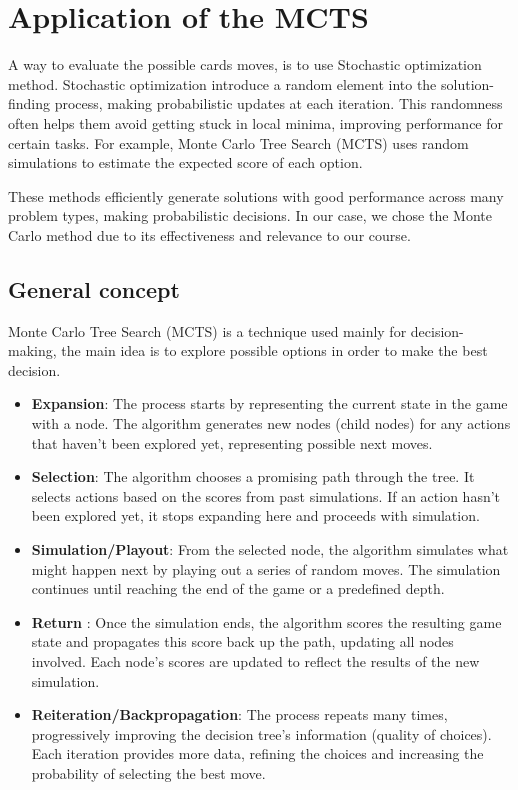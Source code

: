 \chapter{Application of the MCTS}
A way to evaluate the possible cards moves, is to use Stochastic optimization method. Stochastic optimization introduce a random element into the solution-finding process, making probabilistic updates at each iteration. This randomness often helps them avoid getting stuck in local minima, improving performance for certain tasks. For example, Monte Carlo Tree Search (MCTS) uses random simulations to estimate the expected score of each option.

These methods efficiently generate solutions with good performance across many problem types, making probabilistic decisions. In our case, we chose the Monte Carlo method due to its effectiveness and relevance to our course.

\section{General concept}
Monte Carlo Tree Search (MCTS) \cite{6145622} is a technique used mainly for decision-making, the main idea is to explore possible options in order to make the best decision.

\begin{itemize}
    \item \textbf{Expansion}: The process starts by representing the current state in the game with a node. The algorithm generates new nodes (child nodes) for any actions that haven’t been explored yet, representing possible next moves.
    \item \textbf{Selection}: The algorithm chooses a promising path through the tree. It selects actions based on the scores from past simulations. If an action hasn't been explored yet, it stops expanding here and proceeds with simulation.
    \item \textbf{Simulation/Playout}: From the selected node, the algorithm simulates what might happen next by playing out a series of random moves. The simulation continues until reaching the end of the game or a predefined depth.
    \item \textbf{Return} : Once the simulation ends, the algorithm scores the resulting game state and propagates this score back up the path, updating all nodes involved. Each node's scores are updated to reflect the results of the new simulation.
    \item \textbf{Reiteration/Backpropagation}: The process repeats many times, progressively improving the decision tree's information (quality of choices). Each iteration provides more data, refining the choices and increasing the probability of selecting the best move.
\end{itemize}

